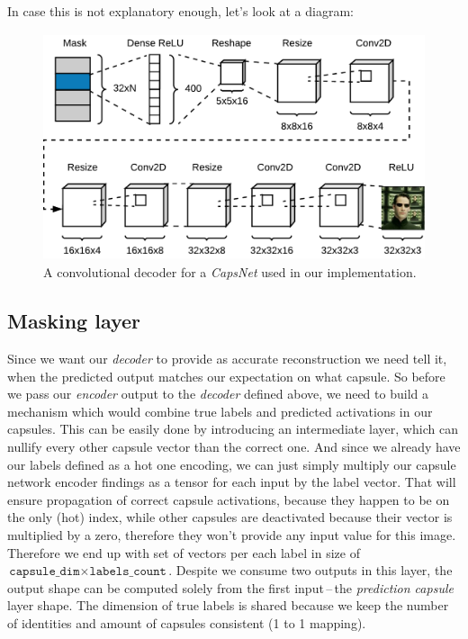 In case this is not explanatory enough, let's look at a diagram:

\begin{figure}[ht]
    \centering
    \includegraphics[height=18em]{obrazky-figures/my_decoder.pdf}
    \caption{A convolutional decoder for a \textit{CapsNet} used in our implementation.}
    \label{fig:decoder}
\end{figure}

\subsection{Masking layer}

Since we want our \textit{decoder} to provide as accurate reconstruction we need tell it, when the predicted output matches our expectation on what capsule. So before we pass our \textit{encoder} output to the \textit{decoder} defined above, we need to build a mechanism which would combine true labels and predicted activations in our capsules. This can be easily done by introducing an intermediate layer, which can nullify every other capsule vector than the correct one. And since we already have our labels defined as a hot one encoding, we can just simply multiply our capsule network encoder findings as a tensor for each input by the label vector. That will ensure propagation of correct capsule activations, because they happen to be on the only (hot) index, while other capsules are deactivated because their vector is multiplied by a zero, therefore they won't provide any input value for this image. Therefore we end up with set of vectors per each label in size of $\texttt{capsule\_dim}\times\texttt{labels\_count}$. Despite we consume two outputs in this layer, the output shape can be computed solely from the first input\,--\,the \textit{prediction capsule} layer shape. The dimension of true labels is shared because we keep the number of identities and amount of capsules consistent (1 to 1 mapping).

